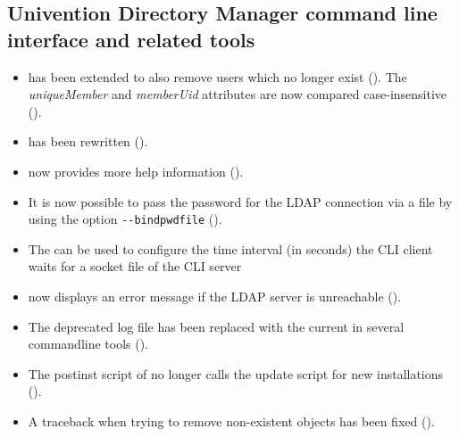 \subsection{Univention Directory Manager command line interface and related tools}
\begin{itemize}
\item {} has been extended to also
  remove users which no longer exist (). The
  \emph{uniqueMember} and \emph{memberUid} attributes are now compared
  case-insensitive ().

\item {} has been rewritten
  ().

\item {} now provides more help
  information ().

\item It is now possible to pass
   the password for the LDAP
  connection via a file by using the option \texttt{-{}-bindpwdfile}
  ().

\item The 
  can be used to configure the time interval (in seconds) the CLI client
  waits for a socket file of the CLI server

\item {} now displays an error
  message if the LDAP server is unreachable ().

\item The deprecated log file  has been
  replaced with the current  in
  several commandline tools ().

\item The postinst script of
 no longer calls the update script
 for new installations
().

\item A traceback when trying to remove non-existent objects has been fixed ().

\end{itemize}


